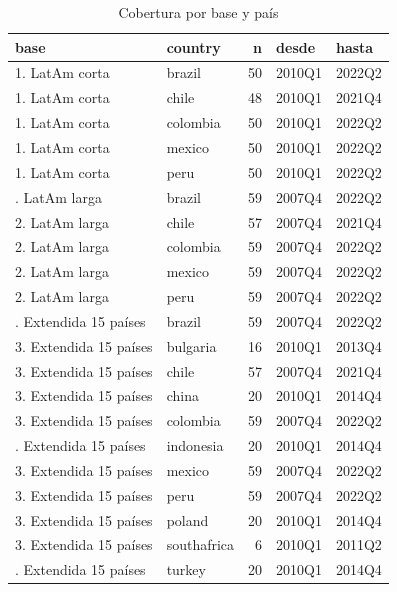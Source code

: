 \documentclass[
]{article}
\begin{document}
\begin{longtable}[t]{llrll}
\caption{\label{tab:coverage-compare}Cobertura por base y país}\\
\toprule
base & country & n & desde & hasta\\
\midrule
1. LatAm corta & brazil & 50 & 2010Q1 & 2022Q2\\
1. LatAm corta & chile & 48 & 2010Q1 & 2021Q4\\
1. LatAm corta & colombia & 50 & 2010Q1 & 2022Q2\\
1. LatAm corta & mexico & 50 & 2010Q1 & 2022Q2\\
1. LatAm corta & peru & 50 & 2010Q1 & 2022Q2\\
\addlinespace
2. LatAm larga & brazil & 59 & 2007Q4 & 2022Q2\\
2. LatAm larga & chile & 57 & 2007Q4 & 2021Q4\\
2. LatAm larga & colombia & 59 & 2007Q4 & 2022Q2\\
2. LatAm larga & mexico & 59 & 2007Q4 & 2022Q2\\
2. LatAm larga & peru & 59 & 2007Q4 & 2022Q2\\
\addlinespace
3. Extendida 15 países & brazil & 59 & 2007Q4 & 2022Q2\\
3. Extendida 15 países & bulgaria & 16 & 2010Q1 & 2013Q4\\
3. Extendida 15 países & chile & 57 & 2007Q4 & 2021Q4\\
3. Extendida 15 países & china & 20 & 2010Q1 & 2014Q4\\
3. Extendida 15 países & colombia & 59 & 2007Q4 & 2022Q2\\
\addlinespace
3. Extendida 15 países & indonesia & 20 & 2010Q1 & 2014Q4\\
3. Extendida 15 países & mexico & 59 & 2007Q4 & 2022Q2\\
3. Extendida 15 países & peru & 59 & 2007Q4 & 2022Q2\\
3. Extendida 15 países & poland & 20 & 2010Q1 & 2014Q4\\
3. Extendida 15 países & southafrica & 6 & 2010Q1 & 2011Q2\\
\addlinespace
3. Extendida 15 países & turkey & 20 & 2010Q1 & 2014Q4\\
\bottomrule
\end{longtable}
\endgroup{}
\end{document}
